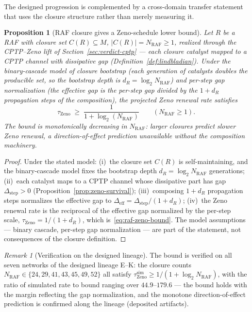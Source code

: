\documentclass[11pt,a4paper]{article}
\theoremstyle{plain}
\newtheorem{proposition}[theorem]{Proposition}
\theoremstyle{definition}
\theoremstyle{remark}
\newtheorem{remark}[theorem]{Remark}
\begin{document}
The designed progression is complemented by a cross-domain
transfer statement that uses the closure structure rather than
merely measuring it.

\begin{proposition}[RAF closure gives a Zeno-schedule lower bound]
\label{prop:raf-zeno-bound}
Let $R$ be a RAF with closure set $C(R)\subseteq M$,
$|C(R)|=N_{\mathrm{RAF}}\geq1$, realized through the CPTP--Zeno
lift of Section~\ref{sec:verdict-cptp} --- each closure catalyst
mapped to a CPTP channel with dissipative gap
(Definition~\ref{def:lindbladian}). Under the binary-cascade
model of closure bootstrap (each generation of catalysts doubles
the producible set, so the bootstrap depth is
$d_R=\log_2 N_{\mathrm{RAF}}$) and per-step gap normalization
(the effective gap is the per-step gap divided by the $1+d_R$
propagation steps of the composition), the projected Zeno renewal
rate satisfies
\begin{equation}\label{eq:raf-zeno-bound}
  \tau_{\mathrm{Zeno}} \;\geq\; \frac{1}{1+\log_2(N_{\mathrm{RAF}})}
  \qquad (N_{\mathrm{RAF}}\geq1).
\end{equation}
The bound is monotonically decreasing in $N_{\mathrm{RAF}}$:
larger closures predict slower Zeno renewal, a
direction-of-effect prediction unavailable without the
composition machinery.
\end{proposition}

\begin{proof}
Under the stated model: (i)~the closure set $C(R)$ is
self-maintaining, and the binary-cascade model fixes the bootstrap
depth $d_R=\log_2N_{\mathrm{RAF}}$ generations; (ii)~each catalyst
maps to a CPTP channel whose dissipative part has gap
$\Delta_{\mathrm{step}}>0$
(Proposition~\ref{prop:zeno-survival}); (iii)~composing
$1+d_R$ propagation steps normalizes the effective gap to
$\Delta_{\mathrm{eff}}=\Delta_{\mathrm{step}}/(1+d_R)$; (iv)~the
Zeno renewal rate is the reciprocal of the effective gap
normalized by the per-step scale, $\tau_{\mathrm{Zeno}}=
1/(1+d_R)$, which is~\eqref{eq:raf-zeno-bound}. The model
assumptions --- binary cascade, per-step gap normalization --- are
part of the statement, not consequences of the closure
definition.
\end{proof}

\begin{remark}[Verification on the designed lineage]
\label{rem:raf-zeno-verification}
The bound is verified on all seven networks of the designed
lineage E--K: the closure counts
$N_{\mathrm{RAF}}\in\{24,29,41,43,45,49,52\}$ all satisfy
$\tau_{\mathrm{Zeno}}^{\mathrm{sim}}\geq1/(1+\log_2
N_{\mathrm{RAF}})$, with the ratio of simulated rate to bound
ranging over $44.9$--$179.6$ --- the bound holds with the margin
reflecting the gap normalization, and the monotone
direction-of-effect prediction is confirmed along the lineage
(deposited artifacts).
\end{remark}
\end{document}

